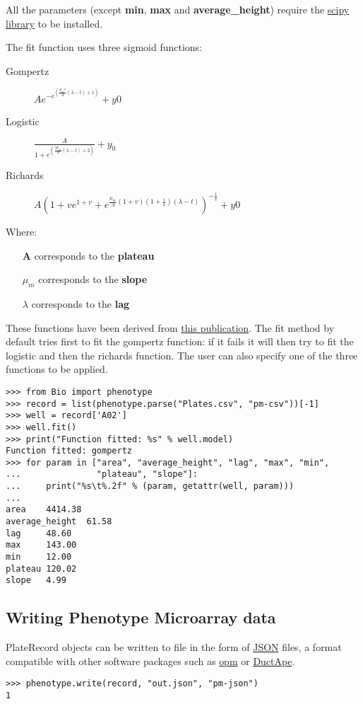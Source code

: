 All the parameters (except \textbf{min}, \textbf{max} and \textbf{average\_height}) require the
\href{http://www.scipy.org/}{scipy library} to be installed.

The fit function uses three sigmoid functions:

\begin{description}
  \item[Gompertz] $Ae^{-e^{(\frac{\mu_{m}e}{A}(\lambda - t) + 1)}} + y0$

  \item[Logistic] $\frac{A}{1+e^{(\frac{4\mu_{m}}{A}(\lambda - t) + 2)}} + y_{0}$

  \item[Richards] $A(1 + ve^{1 + v} + e^{\frac{\mu_{m}}{A}(1 + v)(1 + \frac{1}{v})(\lambda - t)})^{-\frac{1}{v}} + y0$

\end{description}

Where:
\begin{itemize}
  \item[\textbf{A}] corresponds to the \textbf{plateau}

  \item[\textbf{$\mu_{m}$}] corresponds to the \textbf{slope}

  \item[\textbf{$\lambda$}] corresponds to the \textbf{lag}

\end{itemize}

These functions have been derived from \href{http://www.ncbi.nlm.nih.gov/pubmed/16348228}{this publication}.
The fit method by default tries first to fit the gompertz function: if it fails it will then try to fit
the logistic and then the richards function. The user can also specify one of the three functions to be applied.

\begin{verbatim}
>>> from Bio import phenotype
>>> record = list(phenotype.parse("Plates.csv", "pm-csv"))[-1]
>>> well = record['A02'] 
>>> well.fit()
>>> print("Function fitted: %s" % well.model)
Function fitted: gompertz
>>> for param in ["area", "average_height", "lag", "max", "min",
...               "plateau", "slope"]:
...     print("%s\t%.2f" % (param, getattr(well, param)))
...
area    4414.38
average_height  61.58
lag     48.60
max     143.00
min     12.00
plateau 120.02
slope   4.99
\end{verbatim}

\subsection{Writing Phenotype Microarray data}
PlateRecord objects can be written to file in the form of
\href{https://en.wikipedia.org/wiki/JSON}{JSON}
files, a format compatible with other software packages such as
\href{https://www.dsmz.de/research/microorganisms/projects/analysis-of-omnilog-phenotype-microarray-data.html}{opm}
or \href{http://combogenomics.github.io/DuctApe/}{DuctApe}.
\begin{verbatim}
>>> phenotype.write(record, "out.json", "pm-json")
1
\end{verbatim}
